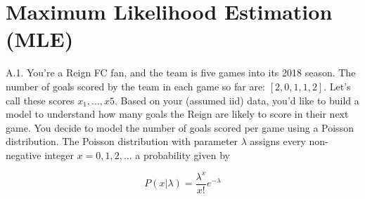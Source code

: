 \documentclass{article}
\newcommand{\1}{\mathbf{1}}
\begin{document}
\newpage
\section*{Maximum Likelihood Estimation (MLE)}

A.1.  You’re a Reign FC fan, and the team is five games into its 2018 season. The number of goals scored by the team in each game so far are: $[2,0,1,1,2]$. Let’s call these scores $x_1,...,x5$.  Based on your (assumed iid) data, you’d like to build a model to understand how many goals the Reign are likely to score in their next game. You decide to model the number of goals scored per game using a Poisson  distribution. The Poisson distribution with parameter $\lambda$ assigns every non-negative integer $x=0,1,2,...$ a probability given by

$$P(x|\lambda)=\frac{\lambda^x}{x!}e^{-\lambda}$$
\end{document}
